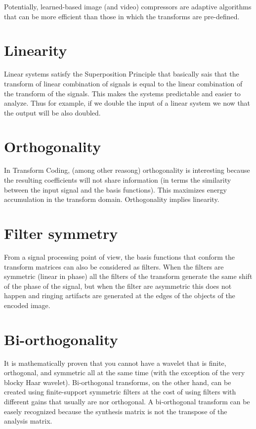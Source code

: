Potentially, learned-based image (and video) compressors are adaptive
algorithms that can be more efficient than those in which the
transforms are pre-defined.


\section{Linearity}
Linear systems satisfy the Superposition Principle that basically sais
that the transform of linear combination of signals is equal to the
linear combination of the transform of the signals. This makes the
systems predictable and easier to analyze. Thus for example, if we
double the input of a linear system we now that the output will be
also doubled.

\section{Orthogonality}
In Transform Coding, (among other reasong) orthogonality is
interesting because the resulting coefficients will not share
information (in terms the similarity between the input signal and the
basis functions). This maximizes energy accumulation in the transform
domain. Orthogonality implies linearity.

\section{Filter symmetry}
From a signal processing point of view, the basis functions that
conform the transform matrices can also be considered as filters. When
the filters are symmetric (linear in phase) all the filters of the
transform generate the same shift of the phase of the signal, but when
the filter are asymmetric this does not happen and ringing artifacts
are generated at the edges of the objects of the encoded image.

\section{Bi-orthogonality}
It is mathematically proven that you cannot have a wavelet that is
finite, orthogonal, and symmetric all at the same time (with the
exception of the very blocky Haar wavelet). Bi-orthogonal transforms,
on the other hand, can be created using finite-support symmetric
filters at the cost of using filters with different gains that usually
are nor orthogonal. A bi-orthogonal transform can be easely recognized
because the synthesis matrix is not the transpose of the analysis
matrix.

